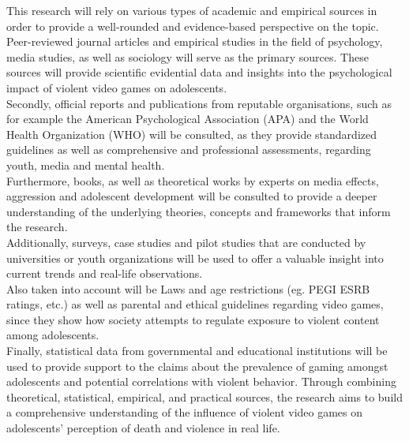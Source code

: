 This research will rely on various types of academic and empirical sources in order to provide a well-rounded and evidence-based perspective on the topic.
Peer-reviewed journal articles and empirical studies in the field of psychology, media studies, as well as sociology will serve as the primary sources.
These sources will provide scientific evidential data and insights into the psychological impact of violent video games on adolescents. \\
Secondly, official reports and publications from reputable organisations, such as for example the American Psychological Association (APA)
and the World Health Organization (WHO)  will be consulted, as they provide standardized guidelines as well as comprehensive and professional assessments,
regarding youth, media and mental health. \\
Furthermore, books, as well as theoretical works by experts on media effects, aggression and adolescent development will be consulted to provide a deeper
understanding of the underlying theories, concepts and frameworks that inform the research. \\
Additionally, surveys, case studies and pilot studies that are conducted by universities or youth organizations will be used to offer a valuable insight
into current trends and real-life observations. \\
Also taken into account will be Laws and age restrictions (eg. PEGI ESRB ratings, etc.) as well as parental and ethical guidelines regarding video games, 
since they show how society attempts to regulate exposure to violent content among adolescents. \\
Finally, statistical data from governmental and educational institutions will be used to provide support to the claims about the prevalence of gaming amongst
adolescents and potential correlations with violent behavior. Through combining theoretical, statistical, empirical, and practical sources, the research aims
to build a comprehensive understanding of the influence of violent video games on adolescents' perception of death and violence in real life.
